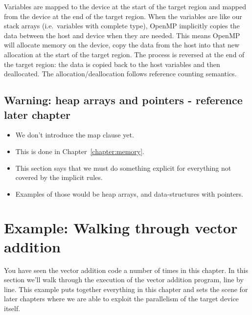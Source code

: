 Variables are mapped to the device at the start of the target region and mapped from the device at the end of the target region.
When the variables are like our stack arrays (i.e.\ variables with complete type), OpenMP implicitly copies the data between the host and device when they are needed.
This means OpenMP will allocate memory on the device, copy the data from the host into that new allocation at the start of the target region.
The process is reversed at the end of the target region: the data is copied back to the host variables and then deallocated.
The allocation/deallocation follows reference counting semantics.



\subsection{Warning: heap arrays and pointers - reference later chapter}
\begin{itemize}
  \item We don't introduce the map clause yet.
  \item This is done in Chapter~\ref{chapter:memory}.
  \item This section says that we must do something explicit for everything not covered by the implicit rules.
  \item Examples of those would be heap arrays, and data-structures with pointers.
\end{itemize}


\section{Example: Walking through vector addition}

You have seen the vector addition code a number of times in this chapter.
In this section we'll walk through the execution of the vector addition program, line by line.
This example puts together everything in this chapter and sets the scene for later chapters where we are able to exploit the parallelism of the target device itself.

